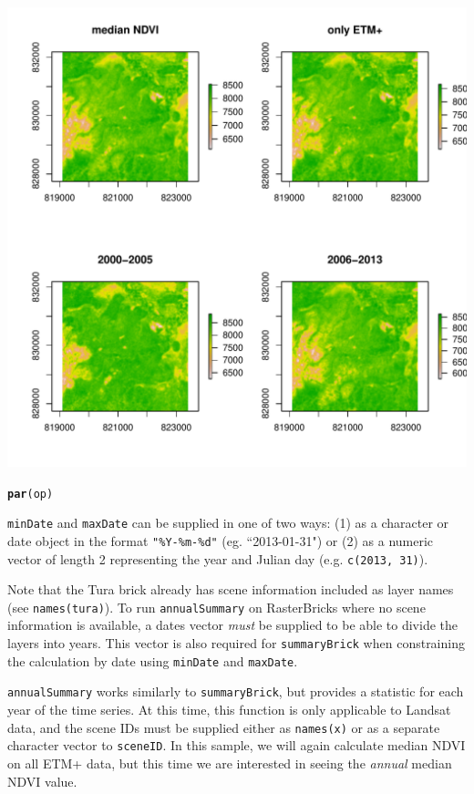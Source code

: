 \documentclass{article}\usepackage[]{graphicx}\usepackage[]{color}
\makeatletter
\def\maxwidth{ %
  \ifdim\Gin@nat@width>\linewidth
    \linewidth
  \else
    \Gin@nat@width
  \fi
}
\newcommand{\hlstd}[1]{\textcolor[rgb]{0.345,0.345,0.345}{#1}}%
\newcommand{\hlkwd}[1]{\textcolor[rgb]{0.737,0.353,0.396}{\textbf{#1}}}%
\newenvironment{kframe}{%
 \def\at@end@of@kframe{}%
 \ifinner\ifhmode%
  \def\at@end@of@kframe{\end{minipage}}%
  \begin{minipage}{\columnwidth}%
 \fi\fi%
 \def\FrameCommand##1{\hskip\@totalleftmargin \hskip-\fboxsep
 \colorbox{shadecolor}{##1}\hskip-\fboxsep
     \hskip-\linewidth \hskip-\@totalleftmargin \hskip\columnwidth}%
 \MakeFramed {\advance\hsize-\width
   \@totalleftmargin\z@ \linewidth\hsize
   \@setminipage}}%
 {\par\unskip\endMakeFramed%
 \at@end@of@kframe}
\newenvironment{knitrout}{}{} %
\def\code#1{\texttt{#1}}
\makeatother
\begin{document}
\begin{knitrout}
\includegraphics[width=\maxwidth]{figure/summaryBrick-dates} 
\begin{kframe}\begin{alltt}
\hlkwd{par}\hlstd{(op)}
\end{alltt}
\end{kframe}
\end{knitrout}


\code{minDate} and \code{maxDate} can be supplied in one of two ways: (1) as a character or date object in the format \code{"\%Y-\%m-\%d"} (eg. ``2013-01-31") or (2) as a numeric vector of length 2 representing the year and Julian day (e.g. \code{c(2013, 31)}).

Note that the Tura brick already has scene information included as layer names (see \code{names(tura)}). To run \code{annualSummary} on RasterBricks where no scene information is available, a dates vector \emph{must} be supplied to be able to divide the layers into years. This vector is also required for \code{summaryBrick} when constraining the calculation by date using \code{minDate} and \code{maxDate}.

\code{annualSummary} works similarly to \code{summaryBrick}, but provides a statistic for each year of the time series. At this time, this function is only applicable to Landsat data, and the scene IDs must be supplied either as \code{names(x)} or as a separate character vector to \code{sceneID}. In this sample, we will again calculate median NDVI on all ETM+ data, but this time we are interested in seeing the \emph{annual} median NDVI value.
\end{document}
